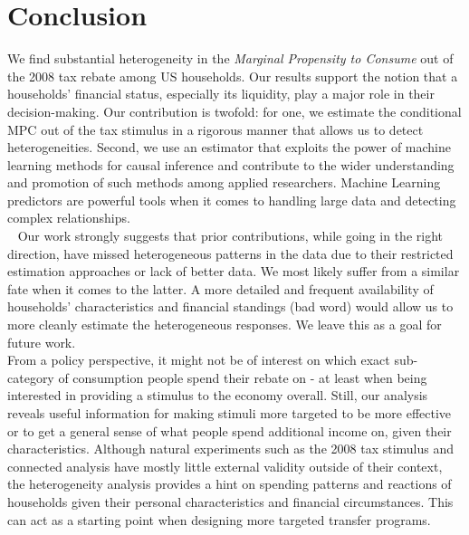 \section{Conclusion} \label{sec:conc}
We find substantial heterogeneity in the \textit{Marginal Propensity to Consume} out of the 2008 tax rebate among US households. Our results support the notion that a households' financial status, especially its liquidity, play a major role in their decision-making. Our contribution is twofold: for one, we estimate the conditional MPC out of the tax stimulus in a rigorous manner that allows us to detect heterogeneities. Second, we use an estimator that exploits the power of machine learning methods for causal inference and contribute to the wider understanding and promotion of such methods among applied researchers. Machine Learning predictors are powerful tools when it comes to handling large data and detecting complex relationships. \\ 
Our work strongly suggests that prior contributions, while going in the right direction, have missed heterogeneous patterns in the data due to their restricted estimation approaches or lack of better data. We most likely suffer from a similar fate when it comes to the latter. A more detailed and frequent availability of households' characteristics and financial standings (bad word) would allow us to more cleanly estimate the heterogeneous responses. We leave this as a goal for future work. \\
From a policy perspective, it might not be of interest on which exact sub-category of consumption people spend their rebate on - at least when being interested in providing a stimulus to the economy overall. Still, our analysis reveals useful information for making stimuli more targeted to be more effective or to get a general sense of what people spend additional income on, given their characteristics. Although natural experiments such as the 2008 tax stimulus and connected analysis have mostly little external validity outside of their context, the heterogeneity analysis provides a hint on spending patterns and reactions of households given their personal characteristics and financial circumstances. This can act as a starting point when designing more targeted transfer programs. 